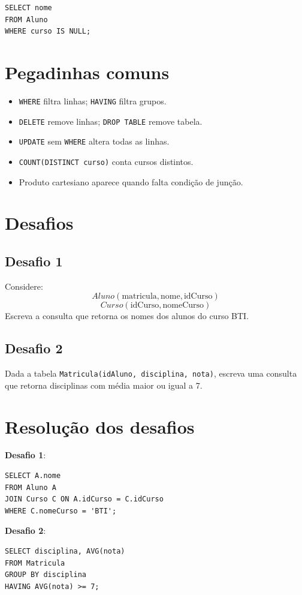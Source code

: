 \documentclass[12pt,a4paper]{article}
\begin{document}
\begin{verbatim}
SELECT nome
FROM Aluno
WHERE curso IS NULL;
\end{verbatim}

\section{Pegadinhas comuns}
\begin{itemize}
    \item \texttt{WHERE} filtra linhas; \texttt{HAVING} filtra grupos.
    \item \texttt{DELETE} remove linhas; \texttt{DROP TABLE} remove tabela.
    \item \texttt{UPDATE} sem \texttt{WHERE} altera todas as linhas.
    \item \texttt{COUNT(DISTINCT curso)} conta cursos distintos.
    \item Produto cartesiano aparece quando falta condição de junção.
\end{itemize}

\section{Desafios}
\subsection*{Desafio 1}
Considere:
\[
Aluno(\text{matricula},\text{nome},\text{idCurso})
\]
\[
Curso(\text{idCurso},\text{nomeCurso})
\]
Escreva a consulta que retorna os nomes dos alunos do curso BTI.

\subsection*{Desafio 2}
Dada a tabela \texttt{Matricula(idAluno, disciplina, nota)}, escreva uma consulta que retorna disciplinas com média maior ou igual a 7.

\section{Resolução dos desafios}
\textbf{Desafio 1}:
\begin{verbatim}
SELECT A.nome
FROM Aluno A
JOIN Curso C ON A.idCurso = C.idCurso
WHERE C.nomeCurso = 'BTI';
\end{verbatim}

\textbf{Desafio 2}:
\begin{verbatim}
SELECT disciplina, AVG(nota)
FROM Matricula
GROUP BY disciplina
HAVING AVG(nota) >= 7;
\end{verbatim}
\end{document}
